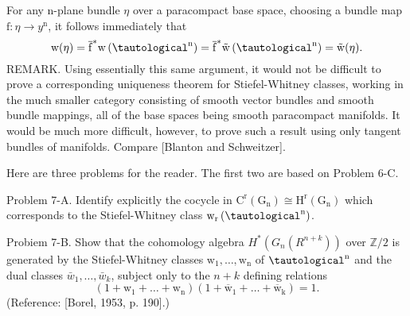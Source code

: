 \documentclass[10pt]{article}
\begin{document}
For any n-plane bundle $\eta$ over a paracompact base space, choosing a bundle map $\mathrm{f}: \eta \rightarrow y^{\mathrm{n}}$, it follows immediately that
$$
\mathrm{w}(\eta)=\overline{\mathrm{f}}^{*} \mathrm{w}\left(\tautological^{\mathrm{n}}\right)=\overline{\mathrm{f}}^{*} \tilde{\mathrm{w}}\left(\tautological^{\mathrm{n}}\right)=\tilde{\mathrm{w}}(\eta) .
$$
REMARK. Using essentially this same argument, it would not be difficult to prove a corresponding uniqueness theorem for Stiefel-Whitney classes, working in the much smaller category consisting of smooth vector bundles and smooth bundle mappings, all of the base spaces being smooth paracompact manifolds. It would be much more difficult, however, to prove such a result using only tangent bundles of manifolds. Compare [Blanton and Schweitzer].

Here are three problems for the reader. The first two are based on Problem 6-C.

Problem 7-A. Identify explicitly the cocycle in $\mathrm{C}^{\mathrm{r}}\left(\mathrm{G}_{\mathrm{n}}\right) \cong \mathrm{H}^{\mathrm{r}}\left(\mathrm{G}_{\mathrm{n}}\right)$ which corresponds to the Stiefel-Whitney class $\mathrm{w}_{\mathrm{r}}\left(\tautological^{\mathrm{n}}\right)$.

Probiem 7-B. Show that the cohomology algebra $H^{*}\left(G_{n}\left(R^{n+k}\right)\right)$ over $\mathbb{Z} / 2$ is generated by the Stiefel-Whitney classes $\mathrm{w}_{1}, \ldots, \mathrm{w}_{\mathrm{n}}$ of $\tautological^{\mathrm{n}}$ and the dual classes $\bar{w}_{1}, \ldots, \bar{w}_{k}$, subject only to the $n+k$ defining relations
$$
\left(1+\mathrm{w}_{1}+\ldots+\mathrm{w}_{\mathrm{n}}\right)\left(1+\overline{\mathrm{w}}_{1}+\ldots+\overline{\mathrm{w}}_{\mathrm{k}}\right)=1 .
$$
(Reference: [Borel, 1953, p. 190].)
\end{document}
